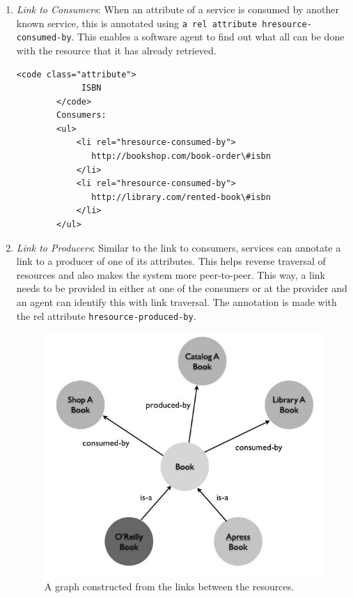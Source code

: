 \begin{spacing}{1.5}
\begin{enumerate}
\item {\it Link to Consumers}: When an attribute of a service is consumed by another known service, this is annotated using \texttt{a rel attribute hresource-consumed-by}. This enables a software agent to find out what all can be done with the resource that it has already retrieved.

\begin{verbatim}
<code class="attribute">
             ISBN
        </code>
        Consumers:
        <ul>
            <li rel="hresource-consumed-by">
               http://bookshop.com/book-order\#isbn
            </li>
            <li rel="hresource-consumed-by">
               http://library.com/rented-book\#isbn
            </li>
        </ul>
\end{verbatim}

\item {\it Link to Producers}: Similar to the link to consumers, services can annotate a link to a producer of one of its attributes. This helps reverse traversal of resources and also makes the system more peer-to-peer. This way, a link needs to be provided in either at one of the consumers or at the provider and an agent can identify this with link traversal. The annotation is made with the rel attribute \texttt{hresource-produced-by}.

\begin{figure}
        \centering
        \includegraphics[scale=0.5]{images/res_graph.png}
        \caption{A graph constructed from the links between the resources.}
        \label{fig:res_graph}
\end{figure}


\end{enumerate}
\end{spacing}
